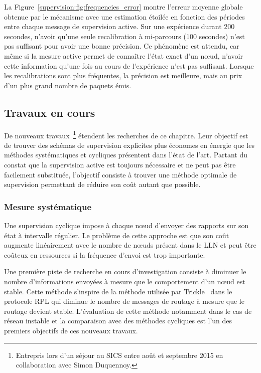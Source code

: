 La Figure~\ref{supervision:fig:frequencies_error} montre l'erreur moyenne globale obtenue par le mécanisme avec une estimation étoilée en fonction des périodes entre chaque message de supervision active.
Sur une expérience durant 200 secondes, n'avoir qu'une seule recalibration à mi-parcours (100 secondes) n'est pas suffisant pour avoir une bonne précision.
Ce phénomène est attendu, car même si la mesure active permet de connaître l'état exact d'un nœud, n'avoir cette information qu'une fois au cours de l'expérience n'est pas suffisant.
Lorsque les recalibrations sont plus fréquentes, la précision est meilleure, mais au prix d'un plus grand nombre de paquets émis.

\subsection{Travaux en cours}
\label{supervision:ingoing}

De nouveaux travaux~\footnote{Entrepris lors d'un séjour au \ac{SICS} entre août et septembre 2015 en collaboration avec Simon Duquennoy.} étendent les recherches de ce chapitre.
Leur objectif est de trouver des schémas de supervision explicites plus économes en énergie que les méthodes systématiques et cycliques présentent dans l'état de l'art.
Partant du constat que la supervision active est toujours nécessaire et ne peut pas être facilement substituée, l'objectif consiste à trouver une méthode optimale de supervision permettant de réduire son coût autant que possible.

\subsubsection{Mesure systématique}

Une supervision cyclique impose à chaque nœud d'envoyer des rapports sur son état à intervalle régulier.
Le problème de cette approche est que son coût augmente linéairement avec le nombre de nœuds présent dans le \ac{LLN} et peut être coûteux en ressources si la fréquence d'envoi est trop importante.

Une première piste de recherche en cours d'investigation consiste à diminuer le nombre d'informations envoyées à mesure que le comportement d'un nœud est stable.
Cette méthode s'inspire de la méthode utilisée par Trickle~\cite{rfc6206} dans le protocole \ac{RPL} qui diminue le nombre de messages de routage à mesure que le routage devient stable.
L'évaluation de cette méthode notamment dans le cas de réseau instable et la comparaison avec des méthodes cycliques est l'un des premiers objectifs de ces nouveaux travaux.

